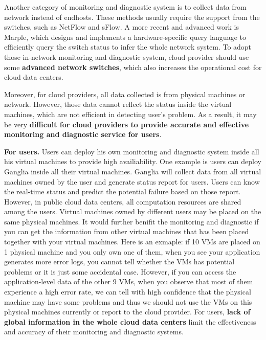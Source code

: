 \documentclass{article}
\begin{document}
Another category of monitoring and diagnostic system is to collect data from network instead of endhosts. These methods usually require the support from the switches, such as NetFlow\cite{url/netflow} and sFlow\cite{url/sflow}. A more recent and advanced work is Marple\cite{sigcomm/marple}, which designs and implements a hardware-specific query language to efficiently query the switch status to infer the whole network system. To adopt those in-network monitoring and diagnostic system, cloud provider should use some \textbf{advanced network switches}, which also increases the operational cost for cloud data centers.

Moreover, for cloud providers, all data collected is from physical machines or network. However, those data cannot reflect the status inside the virtual machines, which are not efficient in detecting user's problem. As a result, it may be very \textbf{difficult for cloud providers to provide accurate and effective monitoring and diagnostic service for users}.

\textbf{For users.}
Users can deploy his own monitoring and diagnostic system inside all his virtual machines to provide high availiability. One example is users can deploy Ganglia\cite{url/ganglia} inside all their virtual machines. Ganglia will collect data from all virtual machines owned by the user and generate status report for users. Users can know the real-time status and predict the potential failure based on those report. However, in public cloud data centers, all computation resources are shared among the users. Virtual machines owned by different users may be placed on the same physical machines\cite{}. It would further benifit the monitoring and diagnostic if you can get the information from other virtual machines that has been placed together with your virtual machines. Here is an exmaple: if 10 VMs are placed on 1 physical machine and you only own one of them, when you see your application generates more error logs, you cannot tell whether the VMs has potential problems or it is just some accidental case. However, if you can access the application-level data of the other 9 VMs, when you observe that most of them experience a high error rate, we can tell with high confidence that the physical machine may have some problems and thus we should not use the VMs on this physical machines currently or report to the cloud provider. For users, \textbf{lack of global information in the whole cloud data centers} limit the effectiveness and accuracy of their monitoring and diagnostic systems.
\end{document}
